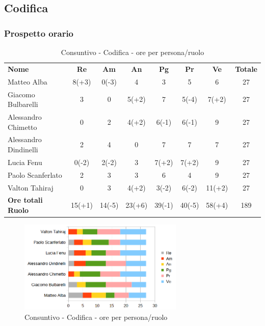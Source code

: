 \newpage

\subsection{Codifica }

\subsubsection{Prospetto orario}
\begin{table} [h!]
	\begin{center}
		\begin{tabular} { m{3.5cm} c c c c c c c }
			\rowcolor{lightgray}
			\textbf{Nome} & \textbf{Re} & \textbf{Am} & \textbf{An} & \textbf{Pg} & \textbf{Pr} & \textbf{Ve} & \textbf{Totale} \\
			Matteo Alba               & 8(+3)      & 0(-3)    & 4      & 3  & 5  & 6      & 27 \\
			Giacomo Bulbarelli        & 3     & 0     & 5(+2)  & 7  & 5(-4)  & 7(+2)      & 27 \\
			Alessandro Chimetto       & 0     & 2    & 4(+2)       & 6(-1)  & 6(-1)  & 9     & 27 \\
			Alessandro Dindinelli     & 2     & 4    & 0       & 7  & 7  & 7  & 27 \\
			Lucia Fenu                & 0(-2)  & 2(-2)  & 3      & 7(+2)   & 7(+2)   & 9      & 27 \\
			Paolo Scanferlato         & 2      & 3      & 3      & 6       & 4       & 9      & 27 \\
			Valton Tahiraj            & 0      & 3      & 4(+2)  & 3(-2)   & 6(-2)   & 11(+2) & 27\\
			\textbf{Ore totali Ruolo} & 15(+1) & 14(-5) & 23(+6) & 39(-1)  & 40(-5)  & 58(+4) & 189\\
		\end{tabular}
		\caption{Consuntivo - Codifica  - ore per persona/ruolo}
	\end{center}
\end{table}
	\begin{figure} [h!]
	\centering
	\includegraphics[width=0.7\textwidth]{res/img/grafici/consuntivo-barre-tb.png}
	\caption{Consuntivo - Codifica  -  ore per persona/ruolo} 
\end{figure}
\newpage
